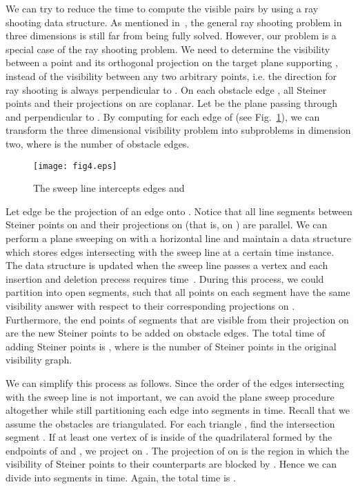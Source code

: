 \documentclass{llncs}
\begin{document}
We can try to reduce the time to compute the visible pairs by using a ray shooting data structure.
As mentioned in~\cite{Shar03}, the general ray shooting problem in three dimensions is still far
from being fully solved.
However, our problem is a special case of the ray shooting problem. We need to determine the visibility
between a point and its orthogonal projection on the target plane  supporting , instead of the
visibility between any two arbitrary points, i.e. the direction for ray shooting is always perpendicular
to . On each obstacle edge , all Steiner points and their projections on  are coplanar.
Let  be the plane passing through  and perpendicular to . By computing
 for each edge of  (see Fig.~\ref{Fig-2d}), we can transform the three dimensional
visibility problem
into  subproblems in dimension two, where  is the number of obstacle edges.

\begin{figure}\begin{center}
    \leavevmode
\texttt{[image: fig4.eps]}
    \caption{The sweep line intercepts edges  and }
    \label{Fig-2d}
    \end{center}
\end{figure}

Let edge  be the projection of an edge  onto .
Notice that all line segments between Steiner points on 
and their projections on  (that is, on ) are parallel. We can perform a plane sweeping on 
with a horizontal line and maintain a data structure which stores edges intersecting with the sweep line
at a certain time instance. The data structure is updated when
the sweep line passes a vertex and
each insertion and deletion precess requires  time~\cite{shamos}. During this process,
we could partition
 into  open segments, such that all points on each segment have the same visibility answer
with respect to their corresponding
projections on . Furthermore, the end points of segments that are visible from their projection on  are the new Steiner points to be added on obstacle edges. The total time of adding Steiner points is , where  is the number of Steiner points in the original visibility graph.

We can simplify this process as follows.
Since the order of the edges intersecting with the sweep line is not important, we
can avoid the plane sweep procedure altogether while still partitioning each edge into  segments
in  time. Recall that we assume the obstacles are triangulated. For each triangle , find the
intersection segment . If at least one vertex of  is inside of the quadrilateral
formed by the endpoints of  and , we project  on . The projection of  on  is the
region in which the visibility of Steiner points to their counterparts are blocked by . Hence we can
divide  into  segments in  time. Again, the total time is .
\end{document}
